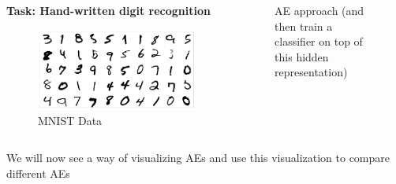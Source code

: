 \begin{frame}
  \begin{columns}

    \begin{overlayarea}{\textwidth}{\textheight}
        \vspace{0.2in}
        \textbf{\large{Task: Hand-written digit recognition}}
        \begin{figure}
            \includegraphics[scale= 0.25]{images/mnist.png}
        \caption{MNIST Data}
        \end{figure}
    \end{overlayarea}

      
    \begin{overlayarea}{\textwidth}{\textheight}

            \begin{figure}
        \hspace{2cm}
        
        \caption{\small{AE approach (and then train a classifier on top of this hidden representation) }}
    \end{figure}
   
    \end{overlayarea}
  \end{columns}
\end{frame}


\begin{frame}
    \begin{block}{}
        We will now see a way of visualizing AEs and use this visualization to compare different AEs
    \end{block}
\end{frame}

